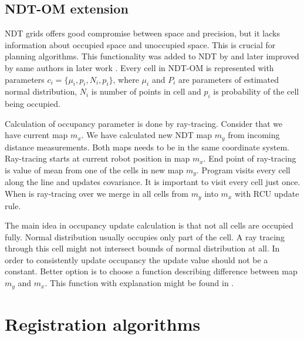 \subsection{NDT-OM extension}
\label{subsec:NDT_OM}
\gls{NDT} grids offers good compromise between space and precision, but it lacks information about occupied space and unoccupied space. This is crucial for planning algorithms. This functionality was added to NDT by \cite{Saarinen13} and later improved by same authors in later work \cite{Saarinen213}. Every cell in \gls{NDT-OM} is represented with parameters $c_{i}=\{\mu_{i}, p_{i}, N_{i},p_{i}\}$, where $\mu_{i}$ and $P_{i}$ are parameters of estimated normal distribution, $N_{i}$ is number of points in cell and $p_{i}$ is probability of the cell being occupied. 

Calculation of occupancy parameter is done by ray-tracing. Consider that we have current map $m_{x}$. We have calculated new NDT map $m_{y}$ from incoming distance measurements. Both maps needs to be in the same coordinate system. Ray-tracing starts at current robot position in map $m_{x}$. End point of ray-tracing is value of mean from one of the cells in new map $m_{y}$. Program visits every cell along the line and updates covariance. It is important to visit every cell just once. When is ray-tracing over we merge in all cells from $m_{y}$ into $m_{x}$ with RCU update rule.

The main idea in occupancy update calculation is that not all cells are occupied fully. Normal distribution usually occupies only part of the cell. A ray tracing through this cell might not intersect bounds of normal distribution at all. In order to consistently update occupancy the update value should not be a constant. Better option is to choose a function describing difference between map $m_{y}$ and $m_{x}$. This function with explanation might be found in \cite{Saarinen213}.



\newpage   
\section{Registration algorithms}
\label{sec:reg_alg}
